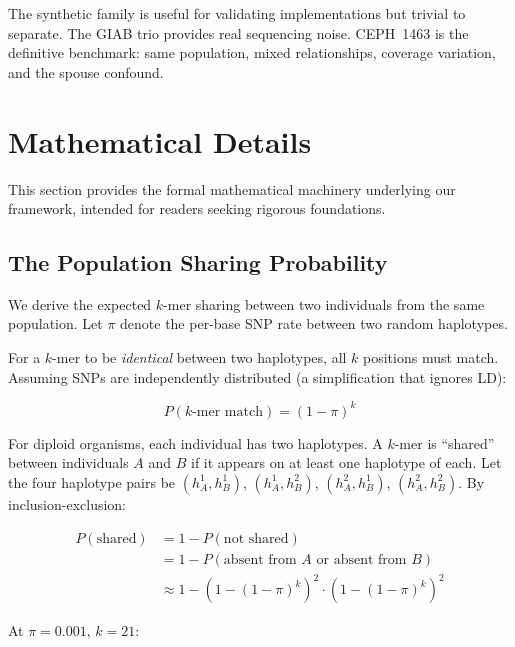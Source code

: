 \documentclass{../yalumba}
\begin{document}
The synthetic family is useful for validating implementations but
trivial to separate.  The GIAB trio provides real sequencing noise.
CEPH~1463 is the definitive benchmark: same population, mixed
relationships, coverage variation, and the spouse confound.


\section{Mathematical Details}
\label{sec:math}

This section provides the formal mathematical machinery underlying
our framework, intended for readers seeking rigorous foundations.

\subsection{The Population Sharing Probability}
\label{sec:math:sharing}

We derive the expected $k$-mer sharing between two individuals from the
same population.  Let $\pi$ denote the per-base SNP rate between two
random haplotypes.

For a $k$-mer to be \emph{identical} between two haplotypes, all $k$
positions must match.  Assuming SNPs are independently distributed
(a simplification that ignores LD):

\begin{equation}
  P(\text{$k$-mer match}) = (1 - \pi)^k
  \label{eq:kmer_match}
\end{equation}

For diploid organisms, each individual has two haplotypes.  A $k$-mer
is ``shared'' between individuals $A$ and $B$ if it appears on at
least one haplotype of each.  Let the four haplotype pairs be
$(h_A^1, h_B^1)$, $(h_A^1, h_B^2)$, $(h_A^2, h_B^1)$, $(h_A^2,
h_B^2)$.  By inclusion-exclusion:

\begin{align}
  P(\text{shared}) &= 1 - P(\text{not shared}) \nonumber \\
  &= 1 - P(\text{absent from $A$ or absent from $B$}) \nonumber \\
  &\approx 1 - (1 - (1-\pi)^k)^2 \cdot (1 - (1-\pi)^k)^2
  \label{eq:diploid_sharing}
\end{align}

At $\pi = 0.001$, $k = 21$:
\end{document}
